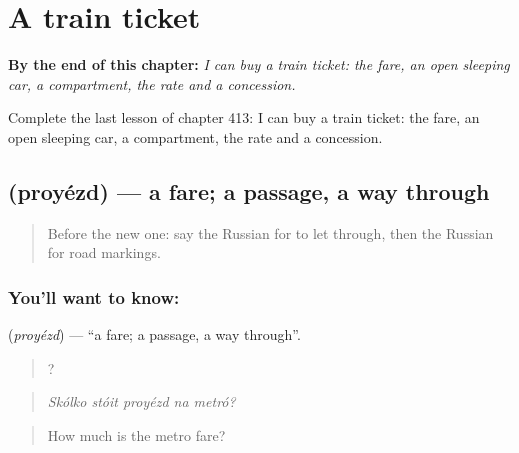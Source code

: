 
\chapter{A train ticket}
\label{ch:ru-a-train-ticket}

\begin{chapteropening}
\textbf{By the end of this chapter:} \emph{I can buy a train ticket: the fare, an open sleeping car, a compartment, the rate and a concession.}

Complete the last lesson of chapter 413: I can buy a train ticket: the fare, an open sleeping car, a compartment, the rate and a concession.
\end{chapteropening}

\section[\texorpdfstring{\ru{проезд} (proyézd)}{проезд (proyézd)}]{ (proyézd) — a fare; a passage, a way through}

\label{lesson:RU-C413-proyezd}



\begin{quote}
Before the new one: say the Russian for to let through, then the Russian for road markings.
\end{quote}

\subsection*{You'll want to know: }
\textbf{} (\emph{proyézd}) — \textquotedblleft{}a fare; a passage, a way through\textquotedblright{}.

\begin{quote}
    ?
\end{quote}

\begin{quote}
\emph{Skólko stóit proyézd na metró?}
\end{quote}

\begin{quote}
How much is the metro fare?
\end{quote}

